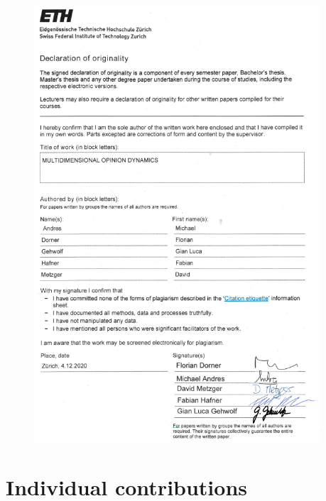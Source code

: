 \documentclass[11pt]{article}
\begin{document}
\newpage

\begin{figure}
    \centering
    \includegraphics[width = 0.95\textwidth]{images/dec_of_origin.png}
    \label{dec_of_orig2}
\end{figure}


\newpage


{
  \hypersetup{linkcolor=black}
  \tableofcontents
}

\newpage



\section{Individual contributions}
\end{document}
